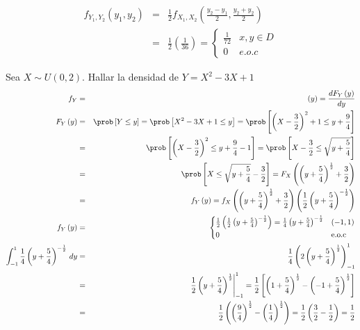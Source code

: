 \begin{eqnarray*}
f_{Y_{1},Y_{2}}\left( y_{1},y_{2}\right)&=& \frac{1}{2} f_{X_{1},X_{2}}\left( \frac{y_{2}-y_{1}}{2}, \frac{y_{2}+y_{2}}{2}\right)\\ 
&=&\frac{1}{2} \left( \frac{1}{36}\right)= \begin{cases}
\frac{1}{72}  & x,y \in D\\
0 & e.o.c
\end{cases} 
\end{eqnarray*}
\begin{Ejem} Sea $X \sim U \left(0,2 \right) $. Hallar la densidad de $Y= X^2 - 3X + 1$
\begin{eqnarray*}
f_{Y}&=& \left(y \right)= \frac{dF_{Y}\left(y \right) }{dy}\\
F_{Y} \left(y \right)&=& \prob \left[ Y \leq y \right] = \prob \left[ X^2 - 3X + 1 \leq y \right] = \prob \left[ \left( X - \frac{3}{2} \right)^2 + 1 \leq y + \frac{9}{4} \right]\\
&=& \prob \left[ \left( X - \frac{3}{2} \right)^2  \leq y + \frac{9}{4}-1 \right] = \prob \left[ X- \frac{3}{2} \leq \sqrt{y+\frac{5}{4} }\right]\\
&=& \prob \left[ X \leq \sqrt{y+\frac{5}{4} } - \frac{3}{2} \right]= F_{X} \left( \left( y+\frac{5}{4} \right)^{ \frac{1}{2} } + \frac{3}{2} \right)\\
&=& f_{Y} \left(y \right)= f_{X} \left( \left(  y + \frac{5}{4}\right)^{ \frac{1}{2}}+ \frac{3}{2}    \right) \left(\frac{1}{2} \left( y + \frac{5}{4} \right)^{- \frac{1}{2} } \right)\\
f_{Y} \left( y \right) &=& \begin{cases} \frac{1}{2}  \left(\frac{1}{2} \left( y + \frac{5}{4} \right)^{- \frac{1}{2} } \right)= \frac{1}{4} \left( y + \frac{5}{4} \right)^{-\frac{1}{2} } & \left(-1,1 \right)\\
0 & \textrm{e.o.c}
\end{cases}\\
\int_{-1}^{1} \frac{1}{4} \left( y + \frac{5}{4} \right)^{-\frac{1}{2} } \, dy &=& \frac{1}{4} \left(2 \left( y + \frac{5}{4} \right)^{ \frac{1}{2} } \right)_{-1}^{1}\\
&=& \left. \frac{1}{2} \left( y + \frac{5}{4} \right)^{\frac{1}{2}} \right|_{-1}^{1} = \frac{1}{2} \left[ \left( 1 + \frac{5}{4} \right)^{ \frac{1}{2} } - \left(-1 + \frac{5}{4} \right)^{ \frac{1}{2} } \right]\\
&=& \frac{1}{2} \left( \left(\frac{9}{4} \right)^{ \frac{1}{2}} - \left(\frac{1}{4} \right)^{ \frac{1}{2}} \right) = \frac{1}{2} \left( \frac{3}{2} - \frac{1}{2} \right) = \frac{1}{2}
\end{eqnarray*}

\end{Ejem}
